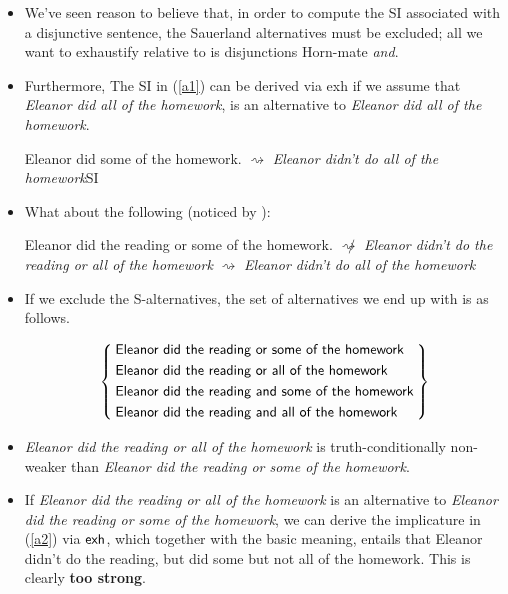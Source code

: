 \documentclass[landscape,cronos,paper=letter]{ling-handout}
\begin{document}
\begin{itemize}

    \item We've seen reason to believe that, in order to compute the SI associated with a disjunctive sentence, the Sauerland alternatives must be excluded; all we want to exhaustify relative to is disjunctions Horn-mate \textit{and}.

    \item Furthermore, The SI in (\ref{a1}) can be derived via \textsf{exh} if we assume that \textit{Eleanor did all of the homework}, is an alternative to \textit{Eleanor did all of the homework}.

\pex
Eleanor did some of the homework.
\a\label{a1}$⇝$ \textit{Eleanor didn't do all of the homework}\hfill SI
\xe


\item What about the following (noticed by \citealt{chierchia2004}):

\pex
Eleanor did the reading or some of the homework.
\a\label{a2}$\not\rightsquigarrow$ \textit{Eleanor didn't do the reading or all of the homework}
\a\label{a3}$\rightsquigarrow$ \textit{Eleanor didn't do all of the homework}
\xe

  \item If we exclude the S-alternatives, the set of alternatives we end up with is as follows.

    \[
    \Set{\begin{aligned}[c]
        &\ensuremath{\textsf{Eleanor did the reading or some of the homework}}\\
        &\ensuremath{\textsf{Eleanor did the reading or all of the homework}}\\
        &\ensuremath{\textsf{Eleanor did the reading and some of the homework}}\\
        &\ensuremath{\textsf{Eleanor did the reading and all of the homework}}
      \end{aligned}}
    \]

\item \textit{Eleanor did the reading or all of the homework} is truth-conditionally non-weaker than \textit{Eleanor did the reading or some of the homework}.

\item If \textit{Eleanor did the reading or all of the homework} is an alternative to \textit{Eleanor did the reading or some of the homework}, we can derive the implicature in (\ref{a2}) via $\textsf{exh}$, which together with the basic meaning, entails that Eleanor didn't do the reading, but did some but not all of the homework. This is clearly \textbf{too strong}.


\end{itemize}
\end{document}

